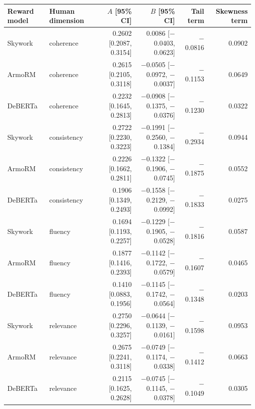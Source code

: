 \begin{tabular}{llrrrr}
\toprule
Reward model & Human dimension & $A$ [95\% CI] & $B$ [95\% CI] & Tail term & Skewness term \\
\midrule
Skywork & coherence & 0.2602 [0.2087, 0.3154] & 0.0086 [$-$0.0403, 0.0623] & $-$0.0816 & 0.0902 \\
ArmoRM & coherence & 0.2615 [0.2105, 0.3118] & $-$0.0505 [$-$0.0972, $-$0.0037] & $-$0.1153 & 0.0649 \\
DeBERTa & coherence & 0.2232 [0.1645, 0.2813] & $-$0.0908 [$-$0.1375, $-$0.0376] & $-$0.1230 & 0.0322 \\
\midrule
Skywork & consistency & 0.2722 [0.2230, 0.3223] & $-$0.1991 [$-$0.2560, $-$0.1384] & $-$0.2934 & 0.0944 \\
ArmoRM & consistency & 0.2226 [0.1662, 0.2811] & $-$0.1322 [$-$0.1906, $-$0.0745] & $-$0.1875 & 0.0552 \\
DeBERTa & consistency & 0.1906 [0.1349, 0.2493] & $-$0.1558 [$-$0.2129, $-$0.0992] & $-$0.1833 & 0.0275 \\
\midrule
Skywork & fluency & 0.1694 [0.1193, 0.2257] & $-$0.1229 [$-$0.1905, $-$0.0528] & $-$0.1816 & 0.0587 \\
ArmoRM & fluency & 0.1877 [0.1416, 0.2393] & $-$0.1142 [$-$0.1722, $-$0.0579] & $-$0.1607 & 0.0465 \\
DeBERTa & fluency & 0.1410 [0.0883, 0.1956] & $-$0.1145 [$-$0.1742, $-$0.0564] & $-$0.1348 & 0.0203 \\
\midrule
Skywork & relevance & 0.2750 [0.2296, 0.3257] & $-$0.0644 [$-$0.1139, $-$0.0161] & $-$0.1598 & 0.0953 \\
ArmoRM & relevance & 0.2675 [0.2241, 0.3118] & $-$0.0749 [$-$0.1174, $-$0.0338] & $-$0.1412 & 0.0663 \\
DeBERTa & relevance & 0.2115 [0.1625, 0.2628] & $-$0.0745 [$-$0.1145, $-$0.0378] & $-$0.1049 & 0.0305 \\
\bottomrule
\end{tabular}
